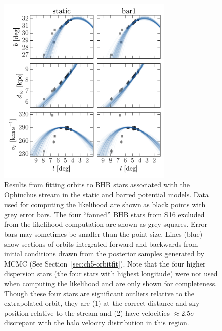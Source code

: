 \begin{figure}[!tbp]
\begin{center}
\includegraphics[width=0.75\textwidth]{figures/ch4/orbitfits}
\caption{ Results from fitting orbits to BHB stars associated with the Ophiuchus
stream in the static and barred potential models. Data used for computing the
likelihood are shown as black points with grey error bars. The four ``fanned''
BHB stars from S16 excluded from the likelihood computation are shown as grey
squares. Error bars may sometimes be smaller than the point size. Lines (blue)
show sections of orbits integrated forward and backwards from initial conditions
drawn from the posterior samples generated by MCMC (See
Section~\ref{sec:ch5-orbitfit}). Note that the four higher dispersion stars (the
four stars with highest longitude) were not used when computing the likelihood
and are only shown for completeness. Though these four stars are significant
outliers relative to the extrapolated orbit, they are (1) at the correct
distance and sky position relative to the stream and (2) have velocities
$\approx$2.5$\sigma$ discrepant with the halo velocity distribution in this
region.}
\label{fig:orbitfits}
\end{center}
\end{figure}

